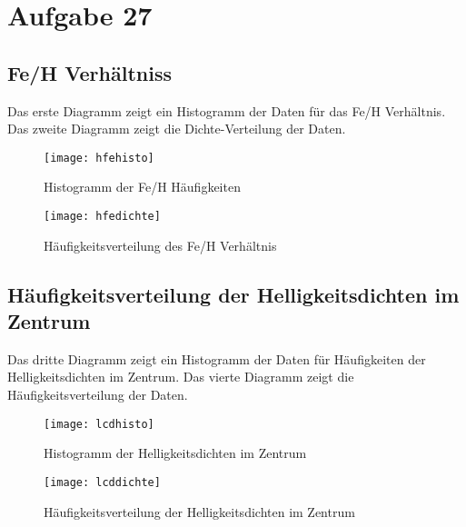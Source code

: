 \section{Aufgabe 27}
\subsection{Fe/H Verhältniss}
Das erste Diagramm zeigt ein Histogramm der Daten für das Fe/H Verhältnis. Das zweite Diagramm zeigt die Dichte-Verteilung der Daten.
\begin{figure}[ht]
\begin{center}
\texttt{[image: hfehisto]}
\end{center}
\caption[Bildunterschrift]{Histogramm der Fe/H Häufigkeiten}
\end{figure}

\begin{figure}[ht]
\begin{center}
\texttt{[image: hfedichte]}
\end{center}
\caption[Bildunterschrift]{Häufigkeitsverteilung des Fe/H Verhältnis}
\end{figure}

\subsection{Häufigkeitsverteilung der Helligkeitsdichten im Zentrum}

Das dritte Diagramm zeigt ein Histogramm der Daten für Häufigkeiten der Helligkeitsdichten im Zentrum. Das vierte Diagramm zeigt die Häufigkeitsverteilung der Daten.
\begin{figure}[ht]
\begin{center}
\texttt{[image: lcdhisto]}
\end{center}
\caption[Bildunterschrift]{Histogramm der Helligkeitsdichten im Zentrum}
\end{figure}

\begin{figure}[ht]
\begin{center}
\texttt{[image: lcddichte]}
\end{center}
\caption[Bildunterschrift]{Häufigkeitsverteilung der Helligkeitsdichten im Zentrum}
\end{figure}
